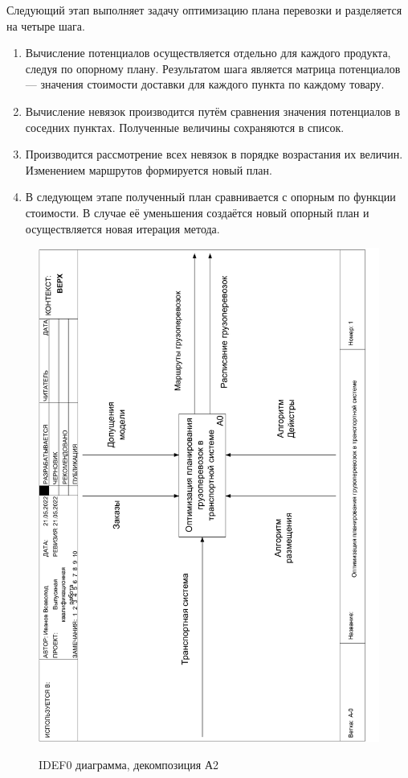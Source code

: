 Следующий этап выполняет задачу оптимизацию плана перевозки и разделяется на четыре шага.
\begin{enumerate}
	\item Вычисление потенциалов осуществляется отдельно для каждого продукта, следуя по опорному плану. Результатом шага является матрица потенциалов --- значения стоимости доставки для каждого пункта по каждому товару.
	\item Вычисление невязок производится путём сравнения значения потенциалов в соседних пунктах. Полученные величины сохраняются в список.
	\item Производится рассмотрение всех невязок в порядке возрастания их величин. Изменением маршрутов формируется новый план.
	\item В следующем этапе полученный план сравнивается с опорным по функции стоимости. В случае её уменьшения создаётся новый опорный план и осуществляется новая итерация метода.
\end{enumerate}

\pagebreak
\begin{figure}[h]
	\begin{center}
		{\includegraphics[scale=0.63, angle=-90, page=4]{img/idef0.pdf}}
		\caption{IDEF0 диаграмма, декомпозиция А2}
		\label{idef0:A2}
	\end{center}
\end{figure}

